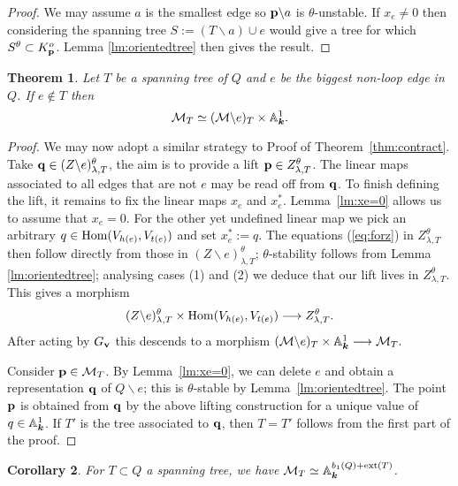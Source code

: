 \documentclass{amsart}
\newtheorem{thm}{Theorem}[section]
\newtheorem{cor}[thm]{Corollary}
\theoremstyle{definition}
\DeclareMathOperator{\extact}{ext}
\begin{document}
\begin{proof}
We may assume $a$ is the smallest edge so $\mathbf{p} \backslash a$ is $\theta$-unstable.
If $x_e \neq0$ then considering the spanning tree $S:= (T\backslash a) \cup e$ would give a tree for which $S^\theta \subset K_{\mathbf{p}}^o$.
Lemma \ref{lm:orientedtree} then gives the result.
\end{proof}

\begin{thm}\label{thm:delete}
Let $T$ be a spanning tree of $Q$ and $e$ be the biggest non-loop edge in $Q$.
If $e \notin T$ then $$\mathcal{M}_T \simeq (\mathcal{M}\backslash e)_T \times \mathbb{A}_{\boldsymbol{k}}^1.$$
\end{thm}

\begin{proof}
We may now adopt a similar strategy to Proof of Theorem~\ref{thm:contract}.
Take $\mathbf{q} \in (Z \backslash e)_{\lambda,T}^\theta$, the aim is to provide a lift $\mathbf{p} \in Z_{\lambda,T}^\theta$.
The linear maps associated to all edges that are not $e$ may be read off from $\mathbf{q}$.
To finish defining the lift, it remains to fix the linear maps $x_e$ and $x_e^*$.
Lemma~\ref{lm:xe=0} allows us to assume that $x_e=0$.
For the other yet undefined linear map we pick an arbitrary $q \in \operatorname{Hom}(V_{h(e)}, V_{t(e)})$ and set $x_e^*:=q$.
The equations (\ref{eq:forz}) in $Z_{\lambda,T}^\theta$ then follow directly from those in $(Z\backslash e)_{\lambda,T}^\theta$; $\theta$-stability follows from Lemma \ref{lm:orientedtree}; analysing cases (1) and (2) we deduce that our lift lives in $Z_{\lambda,T}^\theta$. This gives a morphism $$(Z \backslash e)_{\lambda,T}^\theta \times \operatorname{Hom}(V_{h(e)}, V_{t(e)}) \longrightarrow Z_{\lambda,T}^\theta.$$
After acting by $G_{\mathbf{v}}$ this descends to a morphism $(\mathcal{M} \backslash e)_T \times \mathbb{A}_{\boldsymbol{k}}^1 \longrightarrow \mathcal{M}_T.$

Consider $\mathbf{p}\in\mathcal{M}_T$. By Lemma~\ref{lm:xe=0}, we can delete $e$ and obtain a representation $\mathbf{q}$ of $Q\backslash e$; this is $\theta$-stable by Lemma~\ref{lm:orientedtree}. The point $\mathbf{p}$ is obtained from $\mathbf{q}$ by the above lifting construction for a unique value of $q \in \mathbb{A}^1_{\boldsymbol{k}}$. If $T'$ is the tree associated to $\mathbf{q}$, then $T=T'$ follows from the first part of the proof.
\end{proof}

\begin{cor}
For $T\subset Q$ a spanning tree, we have $\cM_T \simeq \bA_\bk^{b_1(Q)+ \extact(T)}$.
\end{cor}
\end{document}
